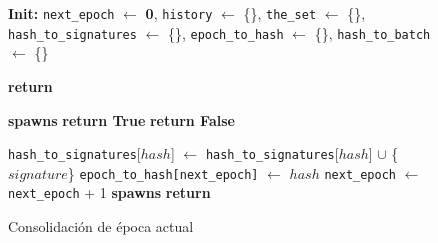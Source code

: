 \begin{figure}[t!]
  \begin{adjustbox}{minipage=[t]{\columnwidth}}
    \begin{algorithm}[H]
      \renewcommand{\thealgorithm}{ABCI Hashchain - Parte 1}
      \caption{Consolidación de época actual}%
      \label{alg:abci-hash1}%
      \small
      \begin{algorithmic}[1]
            \State \textbf{Init:} \texttt{next\_epoch} $\leftarrow$ \textbf{0}, \texttt{history} $\leftarrow$ \{\}, \texttt{the\_set} $\leftarrow$ \{\}, \texttt{hash\_to\_signatures} $\leftarrow$ \{\}, \texttt{epoch\_to\_hash} $\leftarrow$ \{\}, \texttt{hash\_to\_batch} $\leftarrow$ \{\}

            \label{alg:hash_check_tx}
            				\State \textbf{return} 
            			\EndIf

            		
                		\State \textbf{spawns} 
                		\State \textbf{return True}
                	\Else
                		\State \textbf{return False}
                	\EndIf
            		\EndFunction
      
            \label{alg:hash_deliver_tx}
            			\State \texttt{hash\_to\_signatures}[$hash$] $\leftarrow$ \texttt{hash\_to\_signatures}[$hash$] $\cup$  \{$signature$\}
            				\State \texttt{epoch\_to\_hash[next\_epoch]} $\leftarrow$ $hash$
            				\State \texttt{next\_epoch} $\leftarrow$ \texttt{next\_epoch} + 1
                				\State \textbf{spawns} 
                			\EndIf
               	 	\EndIf
               	 \EndIf
                \State \textbf{return}
            \EndFunction
            

\end{algorithmic}
\end{algorithm}
\end{adjustbox}
\end{figure}
